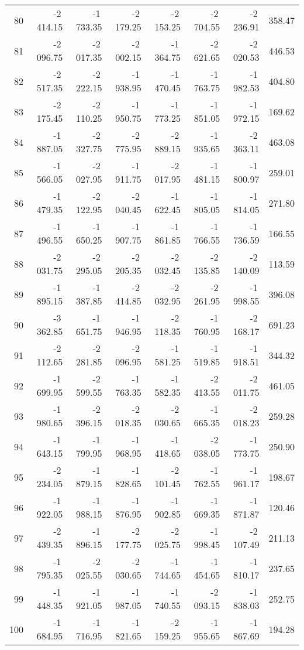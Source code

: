 \begin{longtable}{rrrrrrrr}
80 & -2\,414.15 & -1\,733.35 & -2\,179.25 & -2\,153.25 & -2\,704.55 & -2\,236.91 & 358.47  \\
81 & -2\,096.75 & -2\,017.35 & -2\,002.15 & -1\,364.75 & -2\,621.65 & -2\,020.53 & 446.53  \\
82 & -2\,517.35 & -2\,222.15 & -1\,938.95 & -1\,470.45 & -1\,763.75 & -1\,982.53 & 404.80  \\
83 & -2\,175.45 & -2\,110.25 & -1\,950.75 & -1\,773.25 & -1\,851.05 & -1\,972.15 & 169.62  \\
84 & -1\,887.05 & -2\,327.75 & -2\,775.95 & -2\,889.15 & -1\,935.65 & -2\,363.11 & 463.08  \\
85 & -1\,566.05 & -2\,027.95 & -1\,911.75 & -2\,017.95 & -1\,481.15 & -1\,800.97 & 259.01  \\
86 & -1\,479.35 & -2\,122.95 & -2\,040.45 & -1\,622.45 & -1\,805.05 & -1\,814.05 & 271.80  \\
87 & -1\,496.55 & -1\,650.25 & -1\,907.75 & -1\,861.85 & -1\,766.55 & -1\,736.59 & 166.55  \\
88 & -2\,031.75 & -2\,295.05 & -2\,205.35 & -2\,032.45 & -2\,135.85 & -2\,140.09 & 113.59  \\
89 & -1\,895.15 & -1\,387.85 & -2\,414.85 & -2\,032.95 & -2\,261.95 & -1\,998.55 & 396.08  \\
90 & -3\,362.85 & -1\,651.75 & -1\,946.95 & -2\,118.35 & -1\,760.95 & -2\,168.17 & 691.23  \\
91 & -2\,112.65 & -2\,281.85 & -2\,096.95 & -1\,581.25 & -1\,519.85 & -1\,918.51 & 344.32  \\
92 & -1\,699.95 & -2\,599.55 & -1\,763.35 & -1\,582.35 & -2\,413.55 & -2\,011.75 & 461.05  \\
93 & -1\,980.65 & -2\,396.15 & -2\,018.35 & -2\,030.65 & -1\,665.35 & -2\,018.23 & 259.28  \\
94 & -1\,643.15 & -1\,799.95 & -1\,968.95 & -1\,418.65 & -2\,038.05 & -1\,773.75 & 250.90  \\
95 & -2\,234.05 & -1\,879.15 & -1\,828.65 & -2\,101.45 & -1\,762.55 & -1\,961.17 & 198.67  \\
96 & -1\,922.05 & -1\,988.15 & -1\,876.95 & -1\,902.85 & -1\,669.35 & -1\,871.87 & 120.46  \\
97 & -2\,439.35 & -1\,896.15 & -2\,177.75 & -2\,025.75 & -1\,998.45 & -2\,107.49 & 211.13  \\
98 & -1\,795.35 & -2\,025.55 & -2\,030.65 & -1\,744.65 & -1\,454.65 & -1\,810.17 & 237.65  \\
99 & -1\,448.35 & -1\,921.05 & -1\,987.05 & -1\,740.55 & -2\,093.15 & -1\,838.03 & 252.75  \\
100 & -1\,684.95 & -1\,716.95 & -1\,821.65 & -2\,159.25 & -1\,955.65 & -1\,867.69 & 194.28  \\

\end{longtable}


